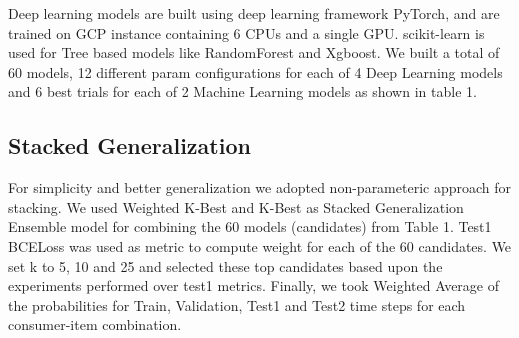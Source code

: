 Deep learning models are built using deep learning framework
PyTorch, and are trained on GCP instance containing 6 CPUs and a single GPU. scikit-learn is used for Tree
based models like RandomForest and Xgboost. We built a total of 60 models, 12 different param configurations for each of 4 
Deep Learning models and 6 best trials for each of 2 Machine Learning models as shown in table 1.
\begin{center}
\begin{table}[!t]
\caption{Model Specifications}
\centering
{}
\end{table} 
\end{center}
\subsection{Stacked Generalization}
For simplicity and better generalization we adopted non-parameteric approach for stacking.
We used Weighted K-Best and K-Best as Stacked Generalization Ensemble model for combining the 60 models (candidates) from Table 1. 
Test1 BCELoss was used as metric to compute weight for each of the 60 candidates. We set k to 5, 10 and 25 and selected 
these top candidates based upon the experiments performed over test1 metrics. Finally, we took Weighted Average of 
the probabilities for Train, Validation, Test1 and Test2 time steps for each consumer-item combination.
